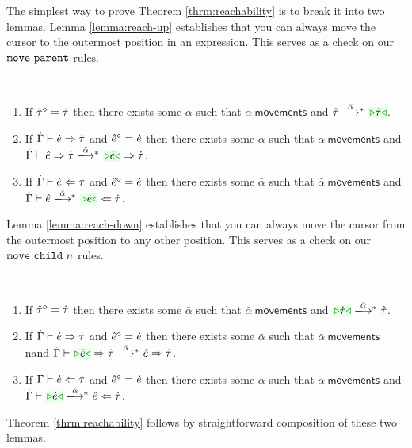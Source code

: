 The simplest way to prove Theorem \ref{thrm:reachability} is to break it
into two lemmas. Lemma \ref{lemma:reach-up} establishes that you can always
move the cursor to the outermost position in an expression. This serves as
a check on our $\mathtt{move}~\mathtt{parent}$ rules.
\begin{lemma}[Reach Up]\label{lemma:reach-up} ~
  \begin{enumerate}[itemsep=0px,partopsep=0px,topsep=0px]
  \item If $\hat{\tau}^{\diamond}=\dot{\tau}$ then there exists some $\bar\alpha$
    such that $\bar\alpha~\mathsf{movements}$ and
    $\performTypI{\ztau}{\bar\alpha}{\zwsel{\htau}}$.

  \item If $\dot{\Gamma} \vdash \dot{e} \Rightarrow \dot{\tau}$ and $\hat{e}^{\diamond}=\dot{e}$
    then there exists some $\bar\alpha$ such that
    $\bar\alpha~\mathsf{movements}$ and
    $\performSynI{\hGamma}{\zexp}{\htau}{\bar\alpha}{\zwsel{\hexp}}{\htau}$.

  \item If $\dot{\Gamma} \vdash \dot{e} \Leftarrow \dot{\tau}$ and $\hat{e}^{\diamond}=\dot{e}$
    then there exists some $\bar\alpha$ such that
    $\bar\alpha~\mathsf{movements}$ and
    $\performAnaI{\hGamma}{\zexp}{\htau}{\bar\alpha}{\zwsel{\hexp}}$.
  \end{enumerate}
\end{lemma}
Lemma \ref{lemma:reach-down} establishes that you can always move the
cursor from the outermost position to any other position. This serves as a
check on our $\mathtt{move}~\mathtt{child}~{n}$ rules.
\begin{lemma}\label{lemma:reach-down} ~
  \begin{enumerate}[itemsep=0px,partopsep=0px,topsep=0px]
  \item If $\hat{\tau}^{\diamond}=\dot{\tau}$ then there exists some $\bar\alpha$
    such that $\bar\alpha~\mathsf{movements}$ and
    $\performTypI{\zwsel{\htau}}{\bar\alpha}{\ztau}$.

  \item If $\dot{\Gamma} \vdash \dot{e} \Rightarrow \dot{\tau}$ and $\hat{e}^{\diamond}=\dot{e}$
    then there exists some $\bar\alpha$ such that
    $\bar\alpha~\mathsf{movements}$ nand
    $\performSynI{\hGamma}{\zwsel{\hexp}}{\htau}{\bar\alpha}{\zexp}{\htau}$.

  \item If $\dot{\Gamma} \vdash \dot{e} \Leftarrow \dot{\tau}$ and $\hat{e}^{\diamond}=\dot{e}$
    then there exists some $\bar\alpha$ such that
    $\bar\alpha~\mathsf{movements}$ and
    $\performAnaI{\hGamma}{\zwsel{\hexp}}{\htau}{\bar\alpha}{\zexp}$.
  \end{enumerate}
\end{lemma}
Theorem \ref{thrm:reachability} follows by straightforward composition of
these two lemmas.

